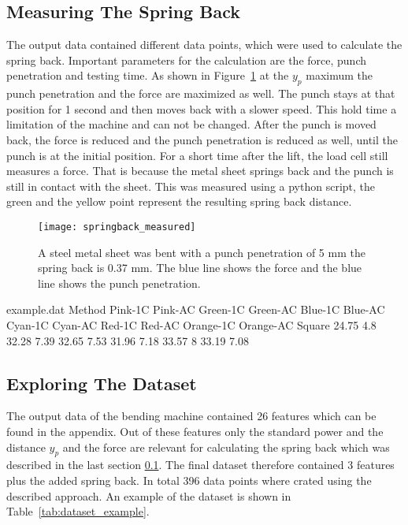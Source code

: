 \subsection{Measuring The Spring Back} \label{sec:measuring_the_spring_back}
The output data contained different data points, which were used to calculate the spring back.
Important parameters for the calculation are the force, punch penetration and testing time.
As shown in Figure~\ref{fig:springback_measured} at the $y_p$ maximum the punch penetration and the force are maximized as well. The punch stays at that position for 1 second and then moves back with a slower speed. This hold time a limitation of the machine and can not be changed.
After the punch is moved back, the force is reduced and the punch penetration is reduced as well, until the punch is at the initial position. For a short time after the lift, the load  cell still measures a force. That is because the metal sheet springs back and the punch is still in contact with the sheet. This was measured using a python script, the green and the yellow point represent the resulting spring back distance.

\begin{figure}[H]
    \centering
    \texttt{[image: springback\_measured]}
    \caption{A steel metal sheet was bent with a punch penetration of 5 mm the spring back is 0.37 mm. The blue line shows the force and the blue line shows the punch penetration.}
    \label{fig:springback_measured}
\end{figure}

\begin{filecontents*}{example.dat}
    Method Pink-1C Pink-AC Green-1C Green-AC Blue-1C Blue-AC Cyan-1C Cyan-AC Red-1C Red-AC Orange-1C Orange-AC
    Square 24.75 4.8 32.28 7.39 32.65 7.53 31.96 7.18 33.57 8 33.19 7.08
\end{filecontents*}

\subsection{Exploring The Dataset}
The output data of the bending machine contained 26 features which can be found in the appendix. Out of these features only the standard power and the distance $y_p$ and the force are relevant for calculating the spring back which was described in the last section \ref{sec:measuring_the_spring_back}.
The final dataset therefore contained 3 features plus the added spring back.
In total 396 data points where crated using the described approach.
An example of the dataset is shown in Table~\ref{tab:dataset_example}.

